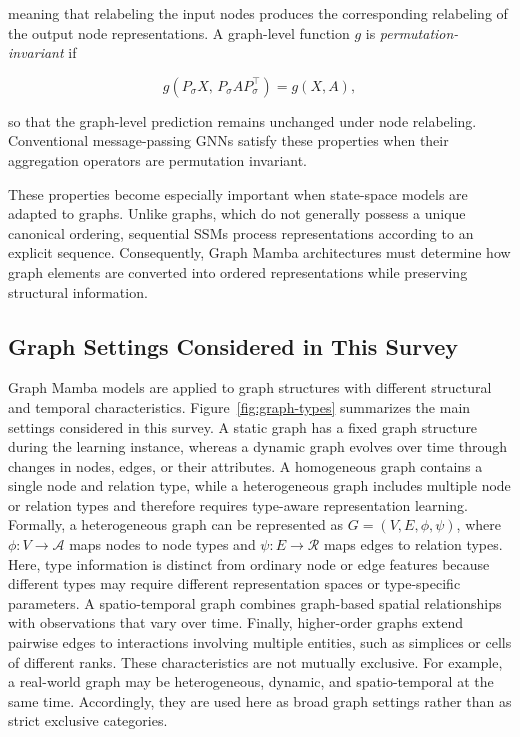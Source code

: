 \documentclass[acmsmall]{acmart}
\begin{document}
meaning that relabeling the input nodes produces the corresponding relabeling
of the output node representations. A graph-level function $g$ is
\emph{permutation-invariant} if

\begin{equation}
g(P_\sigma X,\,
  P_\sigma A P_\sigma^{\top})
=
g(X,A),
\label{eq:invariance}
\end{equation}

so that the graph-level prediction remains unchanged under node relabeling.
Conventional message-passing GNNs satisfy these properties when their
aggregation operators are permutation invariant.

These properties become especially important when state-space models are
adapted to graphs. Unlike graphs, which do not generally possess a unique
canonical ordering, sequential SSMs process representations according to an
explicit sequence. Consequently, Graph Mamba architectures must determine how
graph elements are converted into ordered representations while preserving structural information.  

\subsection{Graph Settings Considered in This Survey}
\label{sec:graph-settings}

Graph Mamba models are applied to graph structures with different structural and
temporal characteristics. Figure~\ref{fig:graph-types} summarizes the main settings considered in
this survey. A static graph has a fixed graph structure during the learning instance,
whereas a dynamic graph evolves over time through changes in nodes, edges, or
their attributes. A homogeneous graph contains a single node and relation type,
while a heterogeneous graph includes multiple node or relation types and
therefore requires type-aware representation learning.
Formally, a heterogeneous graph can be represented as
$G=(V,E,\phi,\psi)$, where $\phi:V\rightarrow\mathcal{A}$ maps nodes to
node types and $\psi:E\rightarrow\mathcal{R}$ maps edges to relation types.
Here, type information is distinct from ordinary node or edge features because
different types may require different representation spaces or type-specific
parameters. A spatio-temporal graph combines graph-based spatial relationships with
observations that vary over time. Finally, higher-order graphs extend pairwise
edges to interactions involving multiple entities, such as simplices or cells
of different ranks. These characteristics are not mutually exclusive. For example, a real-world
graph may be heterogeneous, dynamic, and spatio-temporal at the same time.
Accordingly, they are used here as broad graph settings rather than as strict
exclusive categories.
\end{document}
